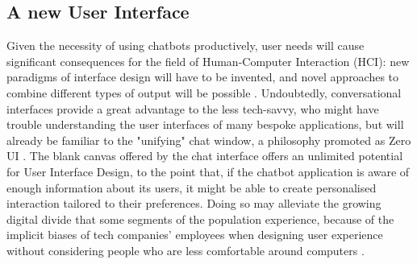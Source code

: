 \subsection{A new User Interface}
Given the necessity of using chatbots productively, user needs will cause significant consequences for the field of Human-Computer Interaction (HCI): new paradigms of interface design will have to be invented, and novel approaches to combine different types of output will be possible \cite{Følstad2017}. Undoubtedly, conversational interfaces provide a great advantage to the less tech-savvy, who might have trouble understanding the user interfaces of many bespoke applications, but will already be familiar to the "unifying" chat window, a philosophy promoted as Zero UI \cite{zeroui}. The blank canvas offered by the chat interface offers an unlimited potential for User Interface Design, to the point that, if the chatbot application is aware of enough information about its users, it might be able to create personalised interaction tailored to their preferences. Doing so may alleviate the growing digital divide that some segments of the population experience, because of the implicit biases of tech companies' employees when designing user experience without considering people who are less comfortable around computers \cite{Brandtzaeg2011}.
